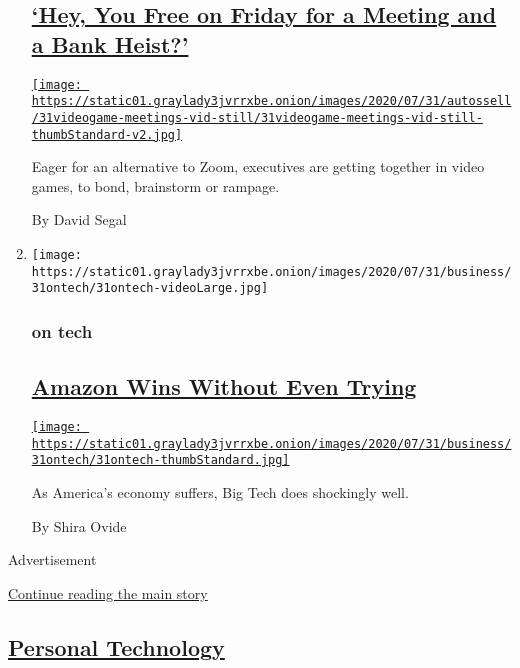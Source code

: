 \begin{enumerate}
  \hypertarget{hey-you-free-on-friday-for-a-meeting-and-a-bank-heist}{%
  \subsection{\texorpdfstring{\href{/2020/07/31/business/video-game-meetings.html}{`Hey,
  You Free on Friday for a Meeting and a Bank
  Heist?'}}{`Hey, You Free on Friday for a Meeting and a Bank Heist?'}}\label{hey-you-free-on-friday-for-a-meeting-and-a-bank-heist}}

  \href{/2020/07/31/business/video-game-meetings.html}{\texttt{[image: https://static01.graylady3jvrrxbe.onion/images/2020/07/31/autossell/31videogame-meetings-vid-still/31videogame-meetings-vid-still-thumbStandard-v2.jpg]}}

  Eager for an alternative to Zoom, executives are getting together in
  video games, to bond, brainstorm or rampage.

  By David Segal
\item
  \texttt{[image: https://static01.graylady3jvrrxbe.onion/images/2020/07/31/business/31ontech/31ontech-videoLarge.jpg]}

  \hypertarget{on-tech}{%
  \subsubsection{on tech}\label{on-tech}}

  \hypertarget{amazon-wins-without-even-trying}{%
  \subsection{\texorpdfstring{\href{/2020/07/31/technology/amazon-earnings.html}{Amazon
  Wins Without Even
  Trying}}{Amazon Wins Without Even Trying}}\label{amazon-wins-without-even-trying}}

  \href{/2020/07/31/technology/amazon-earnings.html}{\texttt{[image: https://static01.graylady3jvrrxbe.onion/images/2020/07/31/business/31ontech/31ontech-thumbStandard.jpg]}}

  As America's economy suffers, Big Tech does shockingly well.

  By Shira Ovide
\end{enumerate}

Advertisement

\protect\hyperlink{after-mid1}{Continue reading the main story}

\hypertarget{personal-technology}{%
\subsection{\texorpdfstring{\href{/section/technology/personaltech}{Personal
Technology}}{Personal Technology}}\label{personal-technology}}


